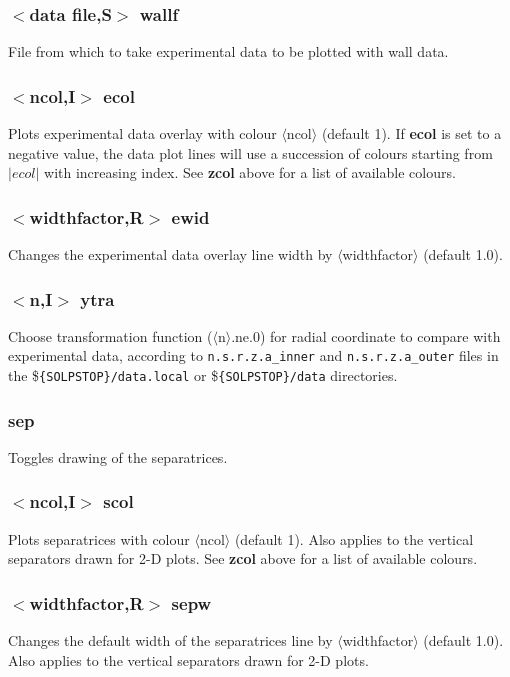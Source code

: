 \documentclass[a4paper,10pt]{report}
\begin{document}
\subsubsection{$<$data file,{\bf S}$>$ wallf}\label{sec:wallf}
File from which to take experimental data to be plotted with wall data.

\subsubsection{$<$ncol,{\bf I}$>$ ecol}\label{sec:ecol}
Plots experimental data overlay with colour $\langle$ncol$\rangle$ (default 1).
If {\bf ecol} is set to a negative value, the data plot lines will use
a succession of colours starting from $|ecol|$ with increasing index.
See {\bf zcol} above for a list of available colours.

\subsubsection{$<$widthfactor,{\bf R}$>$ ewid}\label{sec:ewid}
Changes the experimental data overlay line width by $\langle$widthfactor$\rangle$ (default 1.0).

\subsubsection{$<$n,{\bf I}$>$ ytra}\label{sec:ytra}
Choose transformation function ($\langle$n$\rangle$.ne.0) for radial
coordinate to compare with experimental data, according to
{\tt n.s.r.z.a\_inner} and {\tt n.s.r.z.a\_outer}
files in the \${\tt \{SOLPSTOP\}/data.local} or \${\tt \{SOLPSTOP\}/data}
directories.

\subsubsection{sep}\label{sec:sep}
Toggles drawing of the separatrices.

\subsubsection{$<$ncol,{\bf I}$>$ scol}\label{sec:scol}
Plots separatrices with colour $\langle$ncol$\rangle$ (default 1).
Also applies to the vertical separators drawn for 2-D plots.
See {\bf zcol} above for a list of available colours.

\subsubsection{$<$widthfactor,{\bf R}$>$ sepw}\label{sec:sepw}
Changes the default width of the separatrices line by $\langle$widthfactor$\rangle$ (default 1.0).
Also applies to the vertical separators drawn for 2-D plots.
\end{document}

